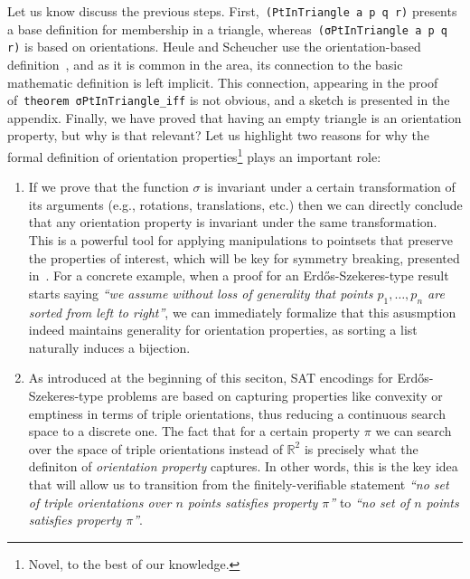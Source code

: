 Let us know discuss the previous steps. First,~\lstinline|(PtInTriangle a p q r)| presents a base definition for membership in a triangle, whereas~\lstinline|(σPtInTriangle a p q r)| is based on orientations. Heule and Scheucher use the orientation-based definition~\cite{emptyHexagonNumber}, and as it is common in the area, its connection to the basic mathematic definition is left implicit. This connection, appearing in the proof of~\lstinline|theorem σPtInTriangle_iff| is not obvious, and a sketch is presented in the appendix. Finally, we have proved that having an empty triangle is an orientation property, but why is that relevant? Let us highlight two reasons for why the formal definition of orientation properties\footnote{Novel, to the best of our knowledge.} plays an important role:
\begin{enumerate}
  \item If we prove that the function $\sigma$ is invariant under a certain transformation of its arguments (e.g., rotations, translations, etc.) then we can directly conclude that any orientation property is invariant under the same transformation. This is a powerful tool for applying manipulations to pointsets that preserve the properties of interest, which will be key for symmetry breaking, presented in~. For a concrete example, when a proof for an Erd\H{o}s-Szekeres-type result starts saying \emph{``we assume without loss of generality that points $p_1, \ldots, p_n$ are sorted from left to right''}, we can immediately formalize that this asusmption indeed maintains generality for orientation properties, as sorting a list naturally induces a bijection. 
  \item As introduced at the beginning of this seciton, SAT encodings for Erd\H{o}s-Szekeres-type problems are based on capturing properties like convexity or emptiness in terms of triple orientations, thus reducing a continuous search space to a discrete one. The fact that for a certain property $\pi$ we can search over the space of triple orientations instead of $\mathbb{R}^2$ is precisely what the definiton of \emph{orientation property} captures. In other words, this is the key idea that will allow us to transition from the finitely-verifiable statement \emph{``no set of triple orientations over $n$ points satisfies property $\pi$''} to \emph{``no set of $n$ points satisfies property $\pi$''}.
\end{enumerate}

\newcommand{\orvar}{\mathbf{o}}

